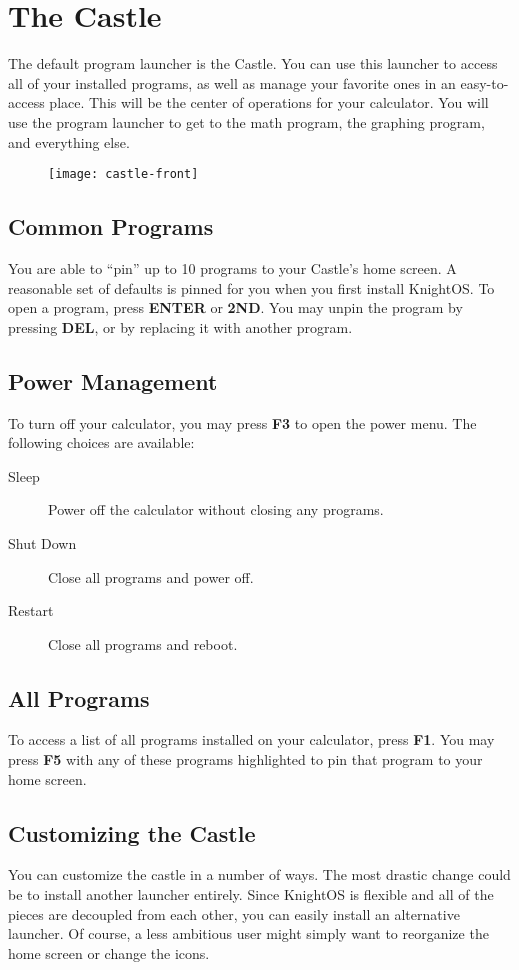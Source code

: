 \chapter{The Castle}

The default program launcher is the Castle. You can use this launcher to access
all of your installed programs, as well as manage your favorite ones in an
easy-to-access place. This will be the center of operations for your calculator.
You will use the program launcher to get to the math program, the graphing
program, and everything else.

\begin{figure}[ht!]
    \centering
    \texttt{[image: castle-front]}
\end{figure}

\section{Common Programs}

You are able to ``pin'' up to 10 programs to your Castle's home screen. A
reasonable set of defaults is pinned for you when you first install KnightOS. To
open a program, press \textbf{ENTER} or \textbf{2ND}. You may unpin the program by
pressing \textbf{DEL}, or by replacing it with another program.

\section{Power Management}

To turn off your calculator, you may press \textbf{F3} to open the power menu.
The following choices are available:

\begin{description}
    \item[Sleep] Power off the calculator without closing any programs.
    \item[Shut Down] Close all programs and power off.
    \item[Restart] Close all programs and reboot.
\end{description}

\section{All Programs}

To access a list of all programs installed on your calculator, press \textbf{F1}.
You may press \textbf{F5} with any of these programs highlighted to pin that
program to your home screen.

\section{Customizing the Castle}

You can customize the castle in a number of ways. The most drastic change could be
to install another launcher entirely. Since KnightOS is flexible and all of the
pieces are decoupled from each other, you can easily install an alternative
launcher. Of course, a less ambitious user might simply want to reorganize the
home screen or change the icons.
